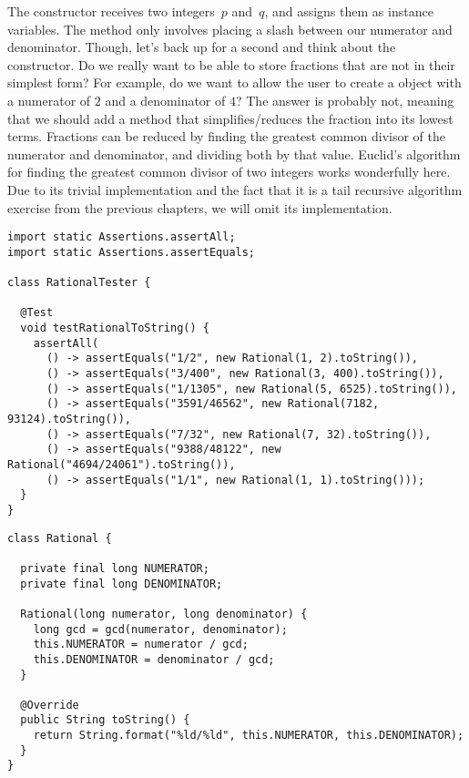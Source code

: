 The  constructor receives two integers~$p$ and~$q$, and assigns them as instance variables. 
The  method only involves placing a slash between our numerator and denominator. 
Though, let's back up for a second and think about the constructor. 
Do we really want to be able to store fractions that are not in their simplest form? 
For example, do we want to allow the user to create a  object with a numerator of $2$ and a denominator of $4$? 
The answer is probably not, meaning that we should add a method that simplifies/reduces the fraction into its lowest terms.
Fractions can be reduced by finding the greatest common divisor of the numerator and denominator, and dividing both by that value. 
Euclid's algorithm for finding the greatest common divisor of two integers works wonderfully here. 
Due to its trivial implementation and the fact that it is a tail recursive algorithm exercise from the previous chapters, we will omit its implementation.

\begin{lstlisting}[language=MyJava]
import static Assertions.assertAll;
import static Assertions.assertEquals;

class RationalTester {
  
  @Test
  void testRationalToString() {
    assertAll(
      () -> assertEquals("1/2", new Rational(1, 2).toString()),
      () -> assertEquals("3/400", new Rational(3, 400).toString()),
      () -> assertEquals("1/1305", new Rational(5, 6525).toString()),
      () -> assertEquals("3591/46562", new Rational(7182, 93124).toString()),
      () -> assertEquals("7/32", new Rational(7, 32).toString()),
      () -> assertEquals("9388/48122", new Rational("4694/24061").toString()),
      () -> assertEquals("1/1", new Rational(1, 1).toString()));
  }
}
\end{lstlisting}

\enlargethispage{-1\baselineskip}
\begin{lstlisting}[language=MyJava]
class Rational {
  
  private final long NUMERATOR;
  private final long DENOMINATOR;

  Rational(long numerator, long denominator) {
    long gcd = gcd(numerator, denominator);
    this.NUMERATOR = numerator / gcd;
    this.DENOMINATOR = denominator / gcd; 
  }

  @Override
  public String toString() {
    return String.format("%ld/%ld", this.NUMERATOR, this.DENOMINATOR);
  }
}
\end{lstlisting}

